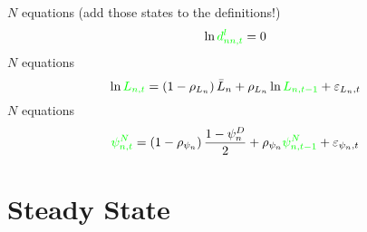 \documentclass[12pt, bibtotoc, tablecaptionabove, figurecaptionabove, fleqn]{article}
\newcommand{\st}[1]{{\color{green}{#1}}}
\begin{document}
\noindent $N$ equations (add those states to the definitions!)
\begin{equation}
\ln \st{d^l_{nn,t}} = 0  
\end{equation}
\noindent $N$ equations
\begin{equation}
\ln \st{L_{n,t}} = \left(1 - \rho_{L_{n}} \right) \bar{L}_{n} + \rho_{L_{n}} \ln  \st{L_{n,t-1}} + \varepsilon_{L_{n},t}    
\end{equation}
\noindent $N$ equations
\begin{equation}
	\st{\psi_{n,t}^N} =  \left(1 - \rho_{\psi_{n}} \right) \frac{1 - \psi^D_{n}}{2} + \rho_{\psi_{n}} \st{\psi_{n,t-1}^N} + \varepsilon_{\psi_{n},t}   
\end{equation}


\section{Steady State}
\end{document}
